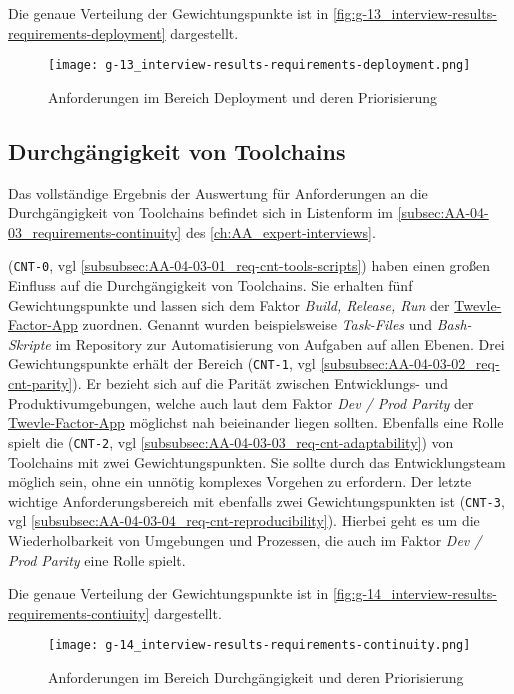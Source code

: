 Die genaue Verteilung der Gewichtungspunkte ist in \autoref{fig:g-13_interview-results-requirements-deployment} dargestellt.

\begin{figure}[h]
    \centering
    \texttt{[image: g-13\_interview-results-requirements-deployment.png]}
    \caption{Anforderungen im Bereich Deployment und deren Priorisierung}
    \label{fig:g-13_interview-results-requirements-deployment}
\end{figure}

\subsection{Durchgängigkeit von Toolchains}
\label{subsec:04-02-04_consistency-of-toolchains}

Das vollständige Ergebnis der Auswertung für Anforderungen an die Durchgängigkeit von Toolchains befindet sich in Listenform im \autoref{subsec:AA-04-03_requirements-continuity} des \autoref{ch:AA_expert-interviews}.

\textbf{} (\texttt{CNT-0}, \acrshort{vgl} \autoref{subsubsec:AA-04-03-01_req-cnt-tools-scripts}) haben einen großen Einfluss auf die Durchgängigkeit von Toolchains. Sie erhalten fünf Gewichtungspunkte und lassen sich dem Faktor \textit{Build, Release, Run} der \hyperref[sec:03-05_basic-idea-of-twelve-factor-app]{Twevle-Factor-App} zuordnen. Genannt wurden beispielsweise \textit{Task-Files} und \textit{Bash-Skripte} im Repository zur Automatisierung von Aufgaben auf allen Ebenen. Drei Gewichtungspunkte erhält der Bereich \textbf{} (\texttt{CNT-1}, \acrshort{vgl} \autoref{subsubsec:AA-04-03-02_req-cnt-parity}). Er bezieht sich auf die Parität zwischen Entwicklungs- und Produktivumgebungen, welche auch laut dem Faktor \textit{Dev / Prod Parity} der \hyperref[sec:03-05_basic-idea-of-twelve-factor-app]{Twevle-Factor-App} möglichst nah beieinander liegen sollten. Ebenfalls eine Rolle spielt die \textbf{} (\texttt{CNT-2}, \acrshort{vgl} \autoref{subsubsec:AA-04-03-03_req-cnt-adaptability}) von Toolchains mit zwei Gewichtungspunkten. Sie sollte durch das Entwicklungsteam möglich sein, ohne ein unnötig komplexes Vorgehen zu erfordern. Der letzte wichtige Anforderungsbereich mit ebenfalls zwei Gewichtungspunkten ist \textbf{} (\texttt{CNT-3}, \acrshort{vgl} \autoref{subsubsec:AA-04-03-04_req-cnt-reproducibility}). Hierbei geht es um die Wiederholbarkeit von Umgebungen und Prozessen, die auch im Faktor \textit{Dev / Prod Parity} eine Rolle spielt.

Die genaue Verteilung der Gewichtungspunkte ist in \autoref{fig:g-14_interview-results-requirements-contiuity} dargestellt.

\begin{figure}[h]
    \centering
    \texttt{[image: g-14\_interview-results-requirements-continuity.png]}
    \caption{Anforderungen im Bereich Durchgängigkeit und deren Priorisierung}
    \label{fig:g-14_interview-results-requirements-contiuity}
\end{figure}
